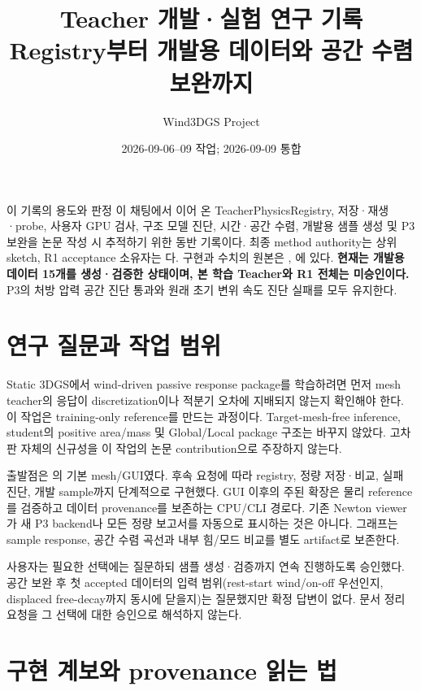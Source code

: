 \documentclass[10pt]{article}
\title{\textbf{Teacher 개발·실험 연구 기록}\\Registry부터 개발용 데이터와 공간 수렴 보완까지}
\author{Wind3DGS Project}\date{2026-09-06--09 작업; 2026-09-09 통합}
\begin{document}
\maketitle

\begin{contractbox}{이 기록의 용도와 판정}
이 채팅에서 이어 온 TeacherPhysicsRegistry, 저장·재생·probe, 사용자 GPU 검사, 구조 모델 진단,
시간·공간 수렴, 개발용 샘플 생성 및 P3 보완을 논문 작성 시 추적하기 위한 동반 기록이다.
최종 method authority는 상위 sketch, R1 acceptance 소유자는 다.
구현과 수치의 원본은 , 에 있다.
\textbf{현재는 개발용 데이터 15개를 생성·검증한 상태이며, 본 학습 Teacher와 R1 전체는 미승인이다.}
P3의 처방 압력 공간 진단 통과와 원래 초기 변위 속도 진단 실패를 모두 유지한다.
\end{contractbox}

\tableofcontents\newpage

\section{연구 질문과 작업 범위}

Static 3DGS에서 wind-driven passive response package를 학습하려면 먼저 mesh teacher의 응답이
discretization이나 적분기 오차에 지배되지 않는지 확인해야 한다. 이 작업은 training-only reference를
만드는 과정이다. Target-mesh-free inference, student의 positive area/mass 및 Global/Local package
구조는 바꾸지 않았다. 고차 판 자체의 신규성을 이 작업의 논문 contribution으로 주장하지 않는다.

출발점은 의 기본 mesh/GUI였다.
후속 요청에 따라 registry, 정량 저장·비교, 실패 진단, 개발 sample까지 단계적으로 구현했다.
GUI 이후의 주된 확장은 물리 reference를 검증하고 데이터 provenance를 보존하는 CPU/CLI 경로다.
기존 Newton viewer가 새 P3 backend나 모든 정량 보고서를 자동으로 표시하는 것은 아니다.
그래프는 sample response, 공간 수렴 곡선과 내부 힘/모드 비교를 별도 artifact로 보존한다.

사용자는 필요한 선택에는 질문하되 샘플 생성·검증까지 연속 진행하도록 승인했다.
공간 보완 후 첫 accepted 데이터의 입력 범위(rest-start wind/on-off 우선인지, displaced free-decay까지
동시에 닫을지)는 질문했지만 확정 답변이 없다. 문서 정리 요청을 그 선택에 대한 승인으로 해석하지 않는다.

\section{구현 계보와 provenance 읽는 법}
\end{document}
